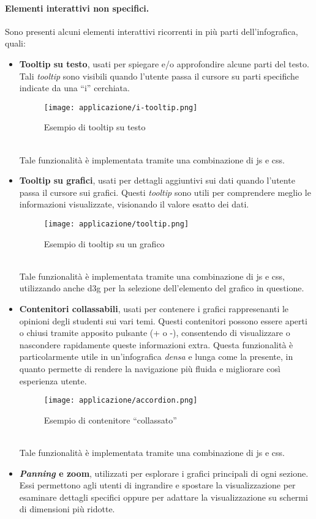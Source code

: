 \paragraph{Elementi interattivi non specifici.}
Sono presenti alcuni elementi interattivi ricorrenti in più parti dell'infografica, quali:
\begin{itemize}
    \item \textbf{Tooltip su testo}, usati per spiegare e/o approfondire alcune parti del testo. Tali \emph{tooltip}
    sono visibili quando l'utente passa il cursore su parti specifiche indicate da una ``i'' cerchiata.
    \begin{figure}[h]
        \centering
        \texttt{[image: applicazione/i-tooltip.png]}
        \caption{Esempio di tooltip su testo}
        \label{fig:app_i-tooltip}
    \end{figure}
    \\Tale funzionalità è implementata tramite una combinazione di \gls{js} e \gls{css}.
    \item \textbf{Tooltip su grafici}, usati per dettagli aggiuntivi sui dati quando l'utente passa il cursore sui grafici. 
    Questi \emph{tooltip} sono utili per comprendere meglio le informazioni visualizzate, visionando il valore esatto dei dati.
    \begin{figure}[h]
        \centering
        \texttt{[image: applicazione/tooltip.png]}
        \caption{Esempio di tooltip su un grafico}
        \label{fig:app_tooltip}
    \end{figure}
    \\Tale funzionalità è implementata tramite una combinazione di \gls{js} e \gls{css}, utilizzando anche \gls{d3g} per la selezione dell'elemento del grafico in questione.
    \item \textbf{Contenitori collassabili}, usati per contenere i grafici rappresenanti le opinioni degli studenti sui vari temi. Questi contenitori 
    possono essere aperti o chiusi tramite apposito pulsante (+ o -), consentendo di visualizzare o nascondere rapidamente queste informazioni extra.
    Questa funzionalità è particolarmente utile in un'infografica \emph{densa} e lunga come la presente, in quanto permette di rendere la navigazione più fluida e 
    migliorare così esperienza utente.
    \begin{figure}[h]
        \centering
        \texttt{[image: applicazione/accordion.png]}
        \caption{Esempio di contenitore ``collassato''}
        \label{fig:app_accordion}
    \end{figure}
    \\Tale funzionalità è implementata tramite una combinazione di \gls{js} e \gls{css}.
    \item \textbf{\emph{Panning} e zoom}, utilizzati per esplorare i grafici principali di ogni sezione. Essi permettono agli utenti di ingrandire e spostare la visualizzazione 
    per esaminare dettagli specifici oppure per adattare la visualizzazione su schermi di dimensioni più ridotte. 
    

\end{itemize}
